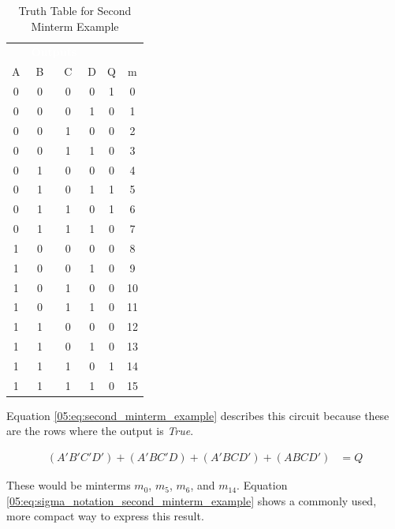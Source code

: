 \begin{table}[H]
  \sffamily
  \newcommand{\head}[1]{\textcolor{white}{\textbf{#1}}}    
  \begin{center}
    \begin{tabular}{cccc|cc} 
      \rowcolor{black!75}
      \multicolumn{4}{c}{\head{Inputs}} & \multicolumn{2}{c}{\head{Outputs}} \\
      A & B & C & D & Q & m \\
      \hline
      0 & 0 & 0 & 0 & 1 & 0 \\
      0 & 0 & 0 & 1 & 0 & 1 \\
      0 & 0 & 1 & 0 & 0 & 2 \\
      0 & 0 & 1 & 1 & 0 & 3 \\
      0 & 1 & 0 & 0 & 0 & 4 \\
      0 & 1 & 0 & 1 & 1 & 5 \\
      0 & 1 & 1 & 0 & 1 & 6 \\
      0 & 1 & 1 & 1 & 0 & 7 \\
      1 & 0 & 0 & 0 & 0 & 8 \\
      1 & 0 & 0 & 1 & 0 & 9 \\
      1 & 0 & 1 & 0 & 0 & 10 \\
      1 & 0 & 1 & 1 & 0 & 11 \\
      1 & 1 & 0 & 0 & 0 & 12 \\
      1 & 1 & 0 & 1 & 0 & 13 \\
      1 & 1 & 1 & 0 & 1 & 14 \\
      1 & 1 & 1 & 1 & 0 & 15 
    \end{tabular}
  \end{center}
  \caption{Truth Table for Second Minterm Example}
  \label{05:tab:truth_table_for_second_minterm_example}
\end{table}

Equation \ref{05:eq:second_minterm_example} describes this circuit because these are the rows where the output is \emph{True}.

\begin{align}
  \label{05:eq:second_minterm_example}
  (A'B'C'D')+(A'BC'D)+(A'BCD')+(ABCD') &= Q
\end{align}

These would be minterms $ m_0 $, $ m_5 $, $ m_6 $, and $ m_{14} $. Equation \ref{05:eq:sigma_notation_second_minterm_example} shows a commonly used, more compact way to express this result.

